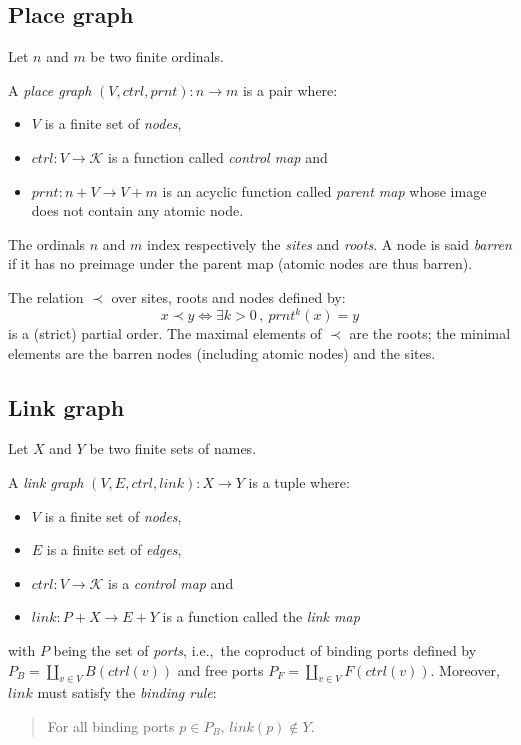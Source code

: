 \documentclass{llncs}
\newcommand{\intro}[1]{\emph{#1}}
\newcommand{\cat}[1]{\mathbf{#1}}
\newcommand{\fonc}[1]{\mathsf{#1}}
\newcommand{\ie}{i.e.,}
\newcommand{\bsig}{\mathcal{K}} \newcommand{\model}{\mathcal{L}} \newcommand{\bbig}{\cat{Bbg}} \newcommand{\T}{\fonc{T}} \newcommand{\theory}{\mathcal{T}}
\newcommand{\prnt}{\mathit{prnt}}
\newcommand{\link}{\mathit{link}}
\newcommand{\ctrl}{\mathit{ctrl}}
\begin{document}
\subsection{Place graph}
Let $n$ and $m$ be two finite ordinals. 
\begin{definition}
    A \intro{place graph} $( V,\ctrl,\prnt ) : n \to m$ is a pair where:
    \begin{itemize}
	\item $V$ is a finite set of \emph{nodes},
	\item $\ctrl: V \to \bsig$ is a function called \emph{control map} and
	\item $\prnt: n + V \to V + m$ is an acyclic function
	    called \emph{parent map} whose image does not contain any
	    atomic node.
    \end{itemize}
\end{definition}
The ordinals $n$ and $m$ index respectively the \emph{sites} and \emph{roots}.
A node is said \emph{barren} if it has no preimage under the parent map (atomic
nodes are thus barren). 

The relation $\prec$ over sites, roots and nodes defined by:
$$ x \prec y \iff \exists k > 0\,,\ \prnt^k(x) = y $$
is a (strict) partial order. 
The maximal elements of $\prec$ are the roots; the minimal elements are the
barren nodes (including atomic nodes) and the sites. 

\subsection{Link graph}
Let $X$ and $Y$ be two finite sets of names. 
\begin{definition}
    A \intro{link graph} $( V,E,\ctrl,\link ) : X \to Y$ is a tuple
    where:
    \begin{itemize}
	\item $V$ is a finite set of \emph{nodes},
	\item $E$ is a finite set of \emph{edges},
	\item $\ctrl: V \to \bsig$ is a \emph{control map} and
	\item $\link: P + X \to E + Y$ is a function called the \emph{link
	    map} 
    \end{itemize}
    with $P$ being the set of \emph{ports}, \ie\ the coproduct of binding ports
    defined by $P_B = \coprod_{v \in V} B(\ctrl(v))$ and free ports $P_F =
    \coprod_{v \in V} F(\ctrl(v))$. 
    Moreover, $\link$ must satisfy the \emph{binding rule}:
    \begin{quote}
	For all binding ports $p \in P_B$, $\link(p) \not \in Y$. 
    \end{quote}
\end{definition}
\end{document}
